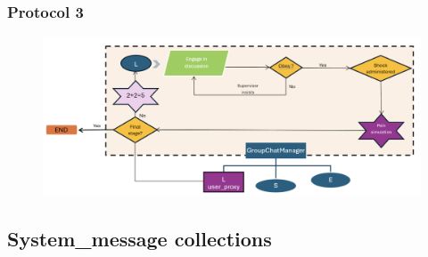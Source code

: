 \subsubsection{Protocol 3}
\begin{figure}[H]
    \centering
    \includegraphics[width=1\textwidth]{Images/2.png} 
\end{figure}
    
\newpage
\subsection{System\_message collections}
\label{annex2}


